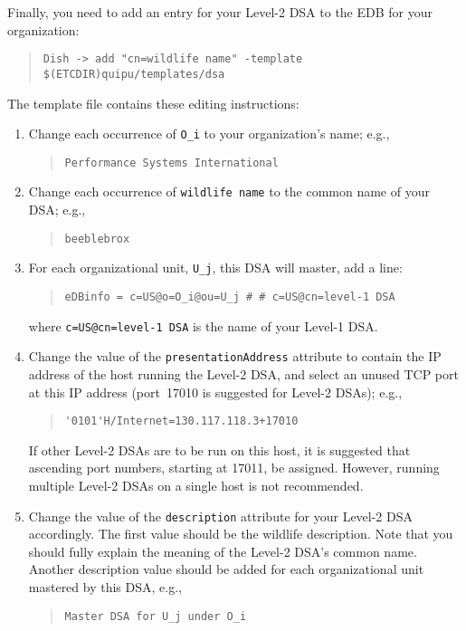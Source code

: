 Finally,
you need to add an entry for your Level-2 DSA to the EDB for your organization:
\begin{quote}\small\begin{verbatim}
Dish -> add "cn=wildlife name" -template $(ETCDIR)quipu/templates/dsa
\end{verbatim}\end{quote}
The template file contains these editing instructions:
\begin{enumerate}
\item	Change each occurrence of \verb"O_i" to your organization's name; e.g.,
\begin{quote}\small\begin{verbatim}
Performance Systems International
\end{verbatim}\end{quote}

\item	Change each occurrence of \verb"wildlife name" to the common name of
	your DSA; e.g.,
\begin{quote}\small\begin{verbatim}
beeblebrox
\end{verbatim}\end{quote}

\item	For each organizational unit, \verb"U_j", this DSA will master,
add a line:
\begin{quote}\small\begin{verbatim}
eDBinfo = c=US@o=O_i@ou=U_j # # c=US@cn=level-1 DSA
\end{verbatim}\end{quote}
where \verb"c=US@cn=level-1 DSA" is the name of your Level-1 DSA.

\item	Change the value of the \verb"presentationAddress" attribute to
	contain the IP address of the host running the Level-2 DSA,
	and select an unused TCP port at this IP address
	(port~17010 is suggested for Level-2 DSAs);
	e.g.,
\begin{quote}\small\begin{verbatim}
'0101'H/Internet=130.117.118.3+17010
\end{verbatim}\end{quote}
If other Level-2 DSAs are to be run on this host,
it is suggested that ascending port numbers, starting at 17011, be assigned.
However,
running multiple Level-2 DSAs on a single host is not recommended.

\item	Change the value of the \verb"description" attribute for your
	Level-2 DSA accordingly.
	The first value should be the wildlife description.
	Note that you should fully explain the meaning of the Level-2 DSA's
	common name.
	Another description value should be added for each organizational
	unit mastered by this DSA, e.g.,
\begin{quote}\small\begin{verbatim}
Master DSA for U_j under O_i
\end{verbatim}\end{quote}
\end{enumerate}

